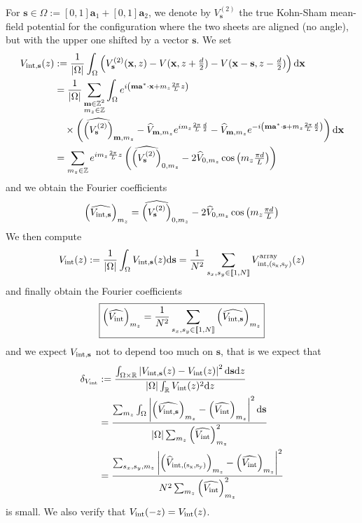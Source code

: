 \documentclass[11pt,a4paper,reqno,french,tikz]{amsart}
\def\d{{\rm d}}
\newcommand{\intent}[1]{\llbracket #1 \rrbracket}
\newcommand{\pa}[1]{\left( #1 \right)} %
\newcommand{\ab}[1]{\left|#1\right|} %
\newcommand{\f}[2]{\frac{#1}{#2}} %
\newcommand{\ind}[1]{_{\textup{#1}}} %
\def\ba{{\mathbf a}}
\def\bx{{\mathbf x}}
\def\bmm{{\mathbf m}}
\def\bs{{\mathbf s}}
\newcommand{\dd}{\tfrac{d}{2}}
\begin{document}
For $\bs \in \Omega := [0,1] \ba_1 + [0,1] \ba_2$, we denote by $V^{(2)}_{\bs}$ the true Kohn-Sham mean-field potential for the configuration where the two sheets are aligned (no angle), but with the upper one shifted by a vector $\bs$. We set
\begin{align*}
	V_{\rm int, \bs}(z) &:= \f{1}{\ab{\Omega}} \int_{\Omega}  \left( V^{(2)}_{\bs}(\bx, z) - V(\bx, z + \dd) - V(\bx - \bs, z -\dd)   \right) \d \bx \\
    &= \f{1}{\ab{\Omega}} \sum_{\substack{\bmm \in \Z^2 \\ m_z \in \Z}} \int_{\Omega} e^{i \pa{\bmm \ba^* \cdot \bx + m_z \f{2\pi}{L} z}} \\
    &\quad \times \pa{ \widehat{\pa{V^{(2)}_{\bs}}}_{\bmm,m_z} - \widehat{V}_{\bmm,m_z}e^{i m_z \f{2\pi}{L} \f{d}{2}} -\widehat{V}_{\bmm,m_z} e^{-i \pa{\bmm \ba^*\cdot \bs +m_z \f{2\pi}{L} \f{d}{2}}}} \d \bx \\
    &= \sum_{\substack{m_z \in \Z}} e^{i  m_z \f{2\pi}{L} z} \pa{ \widehat{\pa{V^{(2)}_{\bs}}}_{0,m_z} - 2 \widehat{V}_{0,m_z} \cos\pa{ m_z \tfrac{\pi d}{L} }}
\end{align*}
and we obtain the Fourier coefficients
\begin{align*}
\pa{\widehat{V_{\rm{int},\bs}}}_{m_z} = \widehat{\pa{V^{(2)}_{\bs}}}_{0,m_z} - 2 \widehat{V}_{0,m_z} \cos\pa{ m_z \tfrac{\pi d}{L} }
\end{align*}
We then compute
\begin{align*}
V\ind{int}(z) := \f{1}{\ab{\Omega}} \int_\Omega V_{\rm int, \bs}(z) \d \bs = \f{1}{N^2} \sum_{\substack{s_x,s_y \in \intent{1,N}}} V^{\rm{array}}_{\rm int, (s_x,s_y)}(z)
\end{align*}
and finally obtain the Fourier coefficients
\begin{align*}
\boxed{\pa{\widehat{V\ind{int}}}_{m_z} = \f{1}{N^2} \sum_{\substack{s_x,s_y \in \intent{1,N}}} \pa{\widehat{V_{\rm{int},\bs}}}_{m_z}}
\end{align*}
and we expect $V_{\rm{int},\bs}$ not to depend too much on $\bs$, that is we expect that
\begin{align*}
	\delta_{V\ind{int}} &:= \f{\int_{\Omega\times \R} \ab{V_{\rm{int},\bs}(z) - V\ind{int}(z)}^2 \d \bs \d z}{\ab{\Omega} \int_{\R} V\ind{int}(z)^2 \d z} \\
&= \f{\sum_{m_z} \int_{\Omega} \ab{\pa{\widehat{V_{\rm{int},\bs}}}_{m_z} - \pa{\widehat{V\ind{int}}}_{m_z}}^2 \d \bs }{\ab{\Omega} \sum_{m_z}  \pa{\widehat{V\ind{int}}}_{m_z}^2} \\
&= \f{\sum_{s_x,s_y,m_z} \ab{\pa{\widehat{V}_{\rm{int},(s_x,s_y)}}_{m_z} - \pa{\widehat{V\ind{int}}}_{m_z}}^2 }{N^2 \sum_{m_z}  \pa{\widehat{V\ind{int}}}_{m_z}^2}
\end{align*}
is small. We also verify that $V\ind{int}(-z) = V\ind{int}(z)$.
\end{document}
